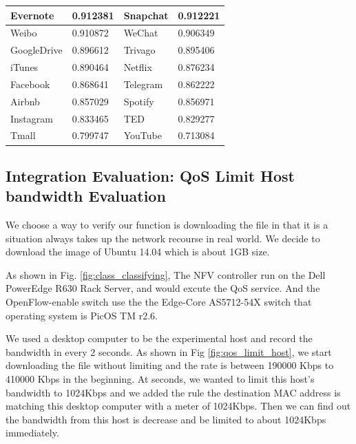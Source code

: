 \documentclass[journal]{IEEEtran}
\begin{document}
\begin{table}[!t]
\begin{tabular}{|l|l|l|l|}
Evernote            & 0.912381            & Snapchat          & 0.912221            \\ \hline
Weibo               & 0.910872            & WeChat            & 0.906349            \\ \hline
GoogleDrive         & 0.896612            & Trivago           & 0.895406             \\ \hline
iTunes              & 0.890464            & Netflix           & 0.876234             \\ \hline
Facebook            & 0.868641            & Telegram          & 0.862222             \\ \hline
Airbnb              & 0.857029            & Spotify           & 0.856971             \\ \hline
Instagram           & 0.833465            & TED               & 0.829277             \\ \hline
Tmall               & 0.799747            & YouTube           & 0.713084             \\ \hline
\end{tabular}
\end{table}

\subsection{Integration Evaluation: QoS Limit Host bandwidth Evaluation}

We choose a way to verify our function is downloading the file in that it is a situation always takes up the network recourse in real world. We decide to download the image of Ubuntu 14.04 which is about 1GB size.

As shown in Fig. \ref{fig:class_classifying}, The NFV controller run on the Dell PowerEdge R630 Rack Server, and would excute the QoS service. And the OpenFlow-enable switch use the the Edge-Core AS5712-54X\cite{edge-core-switch} switch that operating system is PicOS TM r2.6.

We used a desktop computer to be the experimental host and record the bandwidth in every 2 seconds. As shown in Fig \ref{fig:qos_limit_host}, we start downloading the file without limiting and the rate is between 190000 Kbps to 410000 Kbps in the beginning.
At  seconds, we wanted to limit this host’s bandwidth to 1024Kbps and we added the rule the destination MAC address is matching this desktop computer with a meter of 1024Kbps. Then we can find out the bandwidth from this host is decrease and be limited to about 1024Kbps immediately.
\end{document}
